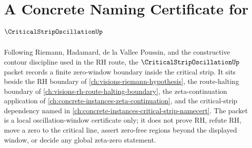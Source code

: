 \chapter{A Concrete Naming Certificate for $\CriticalStripOscillationUp$}
\label{ch:concrete-instances-critical-strip-oscillation-namecert}

Following Riemann, Hadamard, de la Vallee Poussin, and the constructive contour discipline used in the RH route, the $\CriticalStripOscillationUp$ packet records a finite zero-window boundary inside the critical strip. It sits beside the RH boundary of \autoref{ch:visions-riemann-hypothesis}, the route-halting boundary of \autoref{ch:visions-rh-route-halting-boundary}, the zeta-continuation application of \autoref{ch:concrete-instances-zeta-continuation}, and the critical-strip dependency named in \autoref{ch:concrete-instances-critical-strip-namecert}. The packet is a local oscillation-window certificate only; it does not prove RH, refute RH, move a zero to the critical line, assert zero-free regions beyond the displayed window, or decide any global zeta-zero statement.

